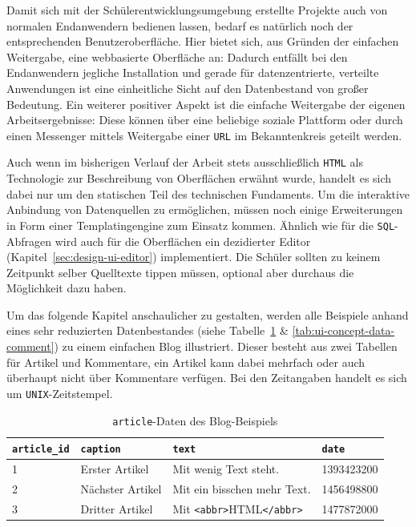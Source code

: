 Damit sich mit der Schülerentwicklungsumgebung erstellte Projekte auch von normalen Endanwendern bedienen lassen, bedarf es natürlich noch der entsprechenden Benutzeroberfläche. Hier bietet sich, aus Gründen der einfachen Weitergabe, eine webbasierte Oberfläche an: Dadurch entfällt bei den Endanwendern jegliche Installation und gerade für datenzentrierte, verteilte Anwendungen ist eine einheitliche Sicht auf den Datenbestand von großer Bedeutung. Ein weiterer positiver Aspekt ist die einfache Weitergabe der eigenen Arbeitsergebnisse: Diese können über eine beliebige soziale Plattform oder durch einen Messenger mittels Weitergabe einer \texttt{URL} im Bekanntenkreis geteilt werden.

Auch wenn im bisherigen Verlauf der Arbeit stets ausschließlich \texttt{HTML} als Technologie zur Beschreibung von Oberflächen erwähnt wurde, handelt es sich dabei nur um den statischen Teil des technischen Fundaments. Um die interaktive Anbindung von Datenquellen zu ermöglichen, müssen noch einige Erweiterungen in Form einer Templatingengine zum Einsatz kommen. Ähnlich wie für die \texttt{SQL}-Abfragen wird auch für die Oberflächen ein dezidierter Editor (Kapitel~\ref{sec:design-ui-editor}) implementiert. Die Schüler sollten zu keinem Zeitpunkt selber Quelltexte tippen müssen, optional aber durchaus die Möglichkeit dazu haben.

Um das folgende Kapitel anschaulicher zu gestalten, werden alle Beispiele anhand eines sehr reduzierten Datenbestandes (siehe Tabelle~\ref{tab:ui-concept-data-article} \& \ref{tab:ui-concept-data-comment}) zu einem einfachen Blog illustriert. Dieser besteht aus zwei Tabellen für Artikel und Kommentare, ein Artikel kann dabei mehrfach oder auch überhaupt nicht über Kommentare verfügen. Bei den Zeitangaben handelt es sich um \texttt{UNIX}-Zeitstempel.

\begin{table}[h]
  \centering
  \begin{tabularx}{\linewidth}{ l l X l }
    \texttt{article\_id}&\texttt{caption}&\texttt{text}&\texttt{date}\\
    \hline
    1&Erster Artikel&Mit wenig Text steht.&1393423200\\
    2&Nächster Artikel&Mit ein bisschen mehr Text.&1456498800\\
    3&Dritter Artikel&Mit \texttt{<abbr>}HTML\texttt{</abbr>}&1477872000\\
  \end{tabularx}
  \caption{\texttt{article}-Daten des Blog-Beispiels}
  \label{tab:ui-concept-data-article}
\end{table}

